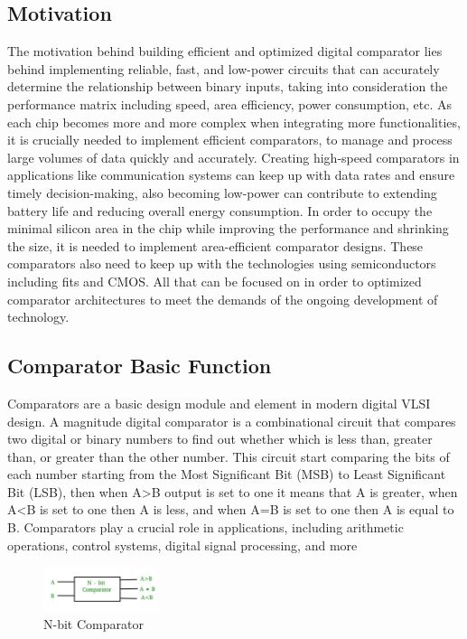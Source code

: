 \documentclass[conference]{IEEEtran}
\begin{document}
\subsection{Motivation}
The motivation behind building efficient and optimized digital comparator lies behind implementing reliable, fast, and low-power circuits that can accurately determine the relationship between binary inputs, taking into consideration the performance matrix including speed, area efficiency, power consumption, etc. 
As each chip becomes more and more complex when integrating more functionalities, it is crucially needed to implement efficient comparators, to manage and process large volumes of data quickly and accurately. Creating high-speed comparators in applications like communication systems can keep up with data rates and ensure timely decision-making, also becoming low-power can contribute to extending battery life and reducing overall energy consumption. In order to occupy the minimal silicon area in the chip while improving the performance and shrinking the size, it is needed to implement area-efficient comparator designs. These comparators also need to keep up with the technologies using semiconductors including fits and CMOS. All that can be focused on in order to optimized comparator architectures to meet the demands of the ongoing development of technology.

\subsection{Comparator Basic Function}
Comparators are a basic design module and element in modern digital VLSI design. A magnitude digital comparator is a combinational circuit that compares two digital or binary numbers to find out whether which is less than, greater than, or greater than the other number. This circuit start comparing the bits of each number starting from the Most Significant Bit (MSB) to Least Significant Bit (LSB), then when A>B output is set to one it means that A is greater, when A<B is set to one then A is less, and when A=B is set to one then A is equal to B. Comparators play a crucial role in applications, including arithmetic operations, control systems, digital signal processing, and more
\begin{figure}[h]
    \centering
    \includegraphics[width=0.3\textwidth]{assets/NbitComparator.png}
    \caption{N-bit Comparator}
    \label{fig:NbitComparator}
\end{figure}
\end{document}
